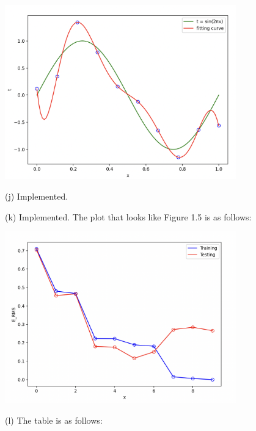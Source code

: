 \begin{solution}
{    }
    \centerline{
        \includegraphics[width=0.75\textwidth]{img/4}
    }

    (j) Implemented.

    (k) Implemented.
    The plot that looks like Figure 1.5 is as follows:

    \centerline{
        \includegraphics[width=0.75\textwidth]{img/rmse}
    }

    (l) The table is as follows:


\end{solution}
